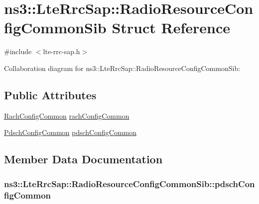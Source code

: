 \hypertarget{structns3_1_1LteRrcSap_1_1RadioResourceConfigCommonSib}{}\section{ns3\+:\+:Lte\+Rrc\+Sap\+:\+:Radio\+Resource\+Config\+Common\+Sib Struct Reference}
\label{structns3_1_1LteRrcSap_1_1RadioResourceConfigCommonSib}


{\ttfamily \#include $<$lte-\/rrc-\/sap.\+h$>$}



Collaboration diagram for ns3\+:\+:Lte\+Rrc\+Sap\+:\+:Radio\+Resource\+Config\+Common\+Sib\+:
\subsection*{Public Attributes}
\begin{DoxyCompactItemize}
\item 
\hyperlink{structns3_1_1LteRrcSap_1_1RachConfigCommon}{Rach\+Config\+Common} \hyperlink{structns3_1_1LteRrcSap_1_1RadioResourceConfigCommonSib_a2dfc3239500869a1fdafc5f496b28cbb}{rach\+Config\+Common}
\item 
\hyperlink{structns3_1_1LteRrcSap_1_1PdschConfigCommon}{Pdsch\+Config\+Common} \hyperlink{structns3_1_1LteRrcSap_1_1RadioResourceConfigCommonSib_a6c1933e8b3527f53123aff3cbf7d338e}{pdsch\+Config\+Common}
\end{DoxyCompactItemize}


\subsection{Member Data Documentation}
\subsubsection[{\texorpdfstring{pdsch\+Config\+Common}{pdschConfigCommon}}]{ ns3\+::\+Lte\+Rrc\+Sap\+::\+Radio\+Resource\+Config\+Common\+Sib\+::pdsch\+Config\+Common}\hypertarget{structns3_1_1LteRrcSap_1_1RadioResourceConfigCommonSib_a6c1933e8b3527f53123aff3cbf7d338e}{}\label{structns3_1_1LteRrcSap_1_1RadioResourceConfigCommonSib_a6c1933e8b3527f53123aff3cbf7d338e}
